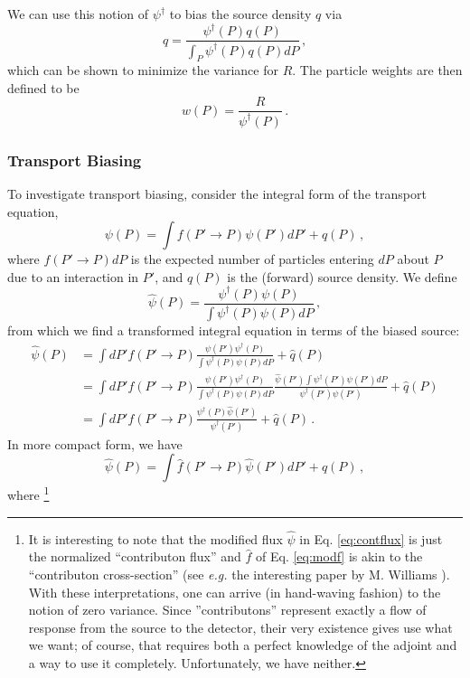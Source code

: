 \documentclass[letter,11pt]{article}
\newcommand{\eg}{{\it e.g. }}
\begin{document}
We can use this notion of $\psi^\dag$ to bias the source density $q$ via
\begin{equation}
 \hat{q} = \frac{\psi^\dag(P) q(P) }{ \int_P \psi^\dag(P) q(P) dP } \, ,
 \label{eq:biassrc}
\end{equation}
which can be shown to minimize the variance for $R$.  The particle weights are then defined to be
\begin{equation}
 w(P) = \frac{R}{\psi^\dag(P)} \, .
\end{equation}

\subsubsection{Transport Biasing}
 To investigate transport biasing, consider the integral form of the transport equation,
\begin{equation}
 \psi(P) = \int f(P'\to P) \psi(P') dP' + q(P) \, ,
\end{equation}
where $f(P' \to P) dP$ is the expected number of particles entering $dP$ about $P$ due to an interaction in $P'$, and $q(P)$ is the (forward) source density.  We define
\begin{equation}
 \hat{\psi}(P) = \frac{ \psi^\dag(P)\psi(P) }{ \int \psi^\dag(P)\psi(P) dP } \, ,
 \label{eq:contflux}
\end{equation}
from which we find a transformed integral equation in terms of the biased source:
\begin{equation}
\begin{split}
 \hat{\psi}(P) &= \int dP' f(P'\to P) \frac{ \psi(P')\psi^\dag(P) }{ \int \psi^\dag(P)\psi(P) dP} + \hat{q}(P) \\
               &= \int dP' f(P'\to P) \frac{ \psi(P')\psi^\dag(P) }{ \int \psi^\dag(P)\psi(P) dP}  \frac{ \hat{\psi}(P') \int \psi^\dag(P')\psi(P') dP}{\psi^\dag(P')\psi(P') }+ \hat{q}(P) \\
               &= \int dP' f(P'\to P) \frac{ \psi^\dag(P) \hat{\psi}(P') }{\psi^\dag(P') }+ \hat{q}(P) \, .
\end{split}
\label{eq:modeq}
\end{equation}
In more compact form, we have
\begin{equation}
  \hat{\psi}(P) = \int \hat{f}(P' \to P) \hat{\psi}(P') dP' + \hat{q}(P) \, ,
\end{equation}
where \footnote{It is interesting to note that the modified flux $\hat{\psi}$ in Eq. \ref{eq:contflux} is just the normalized ``contributon flux'' and $\hat{f}$ of Eq. \ref{eq:modf} is akin to the ``contributon cross-section'' (see \eg the interesting paper by M. Williams \cite{williams1991gcr}).  With these interpretations, one can arrive (in hand-waving fashion) to the notion of zero variance.  Since ''contributons'' represent exactly a flow of response from the source to the detector, their very existence gives use what we want; of course, that requires both a perfect knowledge of the adjoint and a way to use it completely.  Unfortunately, we have neither.}
\end{document}
